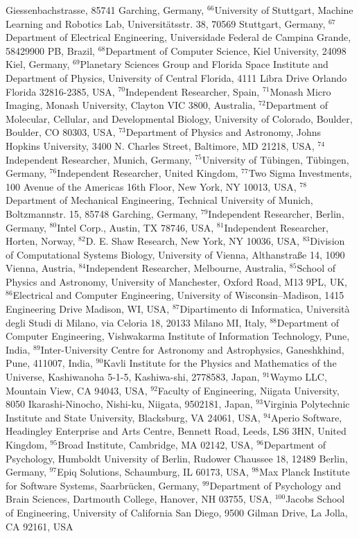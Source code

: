Giessenbachstrasse, 85741 Garching, Germany, $^{66}$University of Stuttgart, Machine Learning and Robotics Lab, Universitätsstr. 38, 70569 Stuttgart, Germany, $^{67}$Department of Electrical Engineering, Universidade Federal de Campina Grande, 58429900 PB, Brazil, $^{68}$Department of Computer Science, Kiel University, 24098 Kiel, Germany, $^{69}$Planetary Sciences Group and Florida Space Institute and Department of Physics, University of Central Florida, 4111 Libra Drive Orlando Florida 32816-2385, USA, $^{70}$Independent Researcher, Spain, $^{71}$Monash Micro Imaging, Monash University, Clayton VIC 3800, Australia, $^{72}$Department of Molecular, Cellular, and Developmental Biology, University of Colorado, Boulder, Boulder, CO 80303, USA, $^{73}$Department of Physics and Astronomy, Johns Hopkins University, 3400 N. Charles Street, Baltimore, MD 21218, USA, $^{74}$Independent Researcher, Munich, Germany, $^{75}$University of T\"ubingen, T\"ubingen, Germany, $^{76}$Independent Researcher, United Kingdom, $^{77}$Two Sigma Investments, 100 Avenue of the Americas 16th Floor, New York, NY 10013, USA, $^{78}$Department of Mechanical Engineering, Technical University of Munich, Boltzmannstr. 15, 85748 Garching, Germany, $^{79}$Independent Researcher, Berlin, Germany, $^{80}$Intel Corp., Austin, TX 78746, USA, $^{81}$Independent Researcher, Horten, Norway, $^{82}$D. E. Shaw Research, New York, NY 10036, USA, $^{83}$Division of Computational Systems Biology, University of Vienna, Althanstra{\ss}e 14, 1090 Vienna, Austria, $^{84}$Independent Researcher, Melbourne, Australia, $^{85}$School of Physics and Astronomy, University of Manchester, Oxford Road, M13 9PL, UK, $^{86}$Electrical and Computer Engineering, University of Wisconsin--Madison, 1415 Engineering Drive Madison, WI, USA, $^{87}$Dipartimento di Informatica, Universit\`a degli Studi di Milano, via Celoria 18, 20133 Milano MI, Italy, $^{88}$Department of Computer Engineering, Vishwakarma Institute of Information Technology, Pune, India, $^{89}$Inter-University Centre for Astronomy and Astrophysics, Ganeshkhind, Pune, 411007, India, $^{90}$Kavli Institute for the Physics and Mathematics of the Universe, Kashiwanoha 5-1-5, Kashiwa-shi, 2778583, Japan, $^{91}$Waymo LLC, Mountain View, CA 94043, USA, $^{92}$Faculty of Engineering, Niigata University, 8050 Ikarashi-Ninocho, Nishi-ku, Niigata, 9502181, Japan, $^{93}$Virginia Polytechnic Institute and State University, Blacksburg, VA 24061, USA, $^{94}$Aperio Software, Headingley Enterprise and Arts Centre, Bennett Road, Leeds, LS6 3HN, United Kingdom, $^{95}$Broad Institute, Cambridge, MA 02142, USA, $^{96}$Department of Psychology, Humboldt University of Berlin, Rudower Chaussee 18, 12489 Berlin, Germany, $^{97}$Epiq Solutions, Schaumburg, IL 60173, USA, $^{98}$Max Planck Institute for Software Systems, Saarbr\"ucken, Germany, $^{99}$Department of Psychology and Brain Sciences, Dartmouth College, Hanover, NH 03755, USA, $^{100}$Jacobs School of Engineering, University of California San Diego, 9500 Gilman Drive, La Jolla, CA 92161, USA
